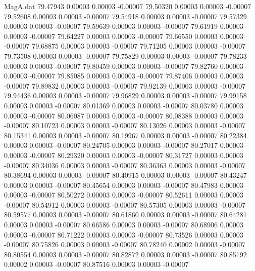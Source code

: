 \begin{filecontents}{MagA.dat}
  79.47943    0.00003    0.00003   -0.00007
  79.50320    0.00003    0.00003   -0.00007
  79.52608    0.00003    0.00003   -0.00007
  79.54918    0.00003    0.00003   -0.00007
  79.57329    0.00003    0.00003   -0.00007
  79.59639    0.00003    0.00003   -0.00007
  79.61919    0.00003    0.00003   -0.00007
  79.64227    0.00003    0.00003   -0.00007
  79.66550    0.00003    0.00003   -0.00007
  79.68875    0.00003    0.00003   -0.00007
  79.71205    0.00003    0.00003   -0.00007
  79.73508    0.00003    0.00003   -0.00007
  79.75829    0.00003    0.00003   -0.00007
  79.78233    0.00003    0.00003   -0.00007
  79.80459    0.00003    0.00003   -0.00007
  79.82760    0.00003    0.00003   -0.00007
  79.85085    0.00003    0.00003   -0.00007
  79.87406    0.00003    0.00003   -0.00007
  79.89832    0.00003    0.00003   -0.00007
  79.92139    0.00003    0.00003   -0.00007
  79.94436    0.00003    0.00003   -0.00007
  79.96829    0.00003    0.00003   -0.00007
  79.99158    0.00003    0.00003   -0.00007
  80.01369    0.00003    0.00003   -0.00007
  80.03780    0.00003    0.00003   -0.00007
  80.06087    0.00003    0.00003   -0.00007
  80.08388    0.00003    0.00003   -0.00007
  80.10723    0.00003    0.00003   -0.00007
  80.13026    0.00003    0.00003   -0.00007
  80.15341    0.00003    0.00003   -0.00007
  80.19967    0.00003    0.00003   -0.00007
  80.22384    0.00003    0.00003   -0.00007
  80.24705    0.00003    0.00003   -0.00007
  80.27017    0.00003    0.00003   -0.00007
  80.29320    0.00003    0.00003   -0.00007
  80.31727    0.00003    0.00003   -0.00007
  80.34036    0.00003    0.00003   -0.00007
  80.36363    0.00003    0.00003   -0.00007
  80.38694    0.00003    0.00003   -0.00007
  80.40915    0.00003    0.00003   -0.00007
  80.43247    0.00003    0.00003   -0.00007
  80.45654    0.00003    0.00003   -0.00007
  80.47983    0.00003    0.00003   -0.00007
  80.50272    0.00003    0.00003   -0.00007
  80.52611    0.00003    0.00003   -0.00007
  80.54912    0.00003    0.00003   -0.00007
  80.57305    0.00003    0.00003   -0.00007
  80.59577    0.00003    0.00003   -0.00007
  80.61860    0.00003    0.00003   -0.00007
  80.64281    0.00003    0.00003   -0.00007
  80.66586    0.00003    0.00003   -0.00007
  80.68906    0.00003    0.00003   -0.00007
  80.71222    0.00003    0.00003   -0.00007
  80.73526    0.00003    0.00003   -0.00007
  80.75826    0.00003    0.00003   -0.00007
  80.78240    0.00002    0.00003   -0.00007
  80.80554    0.00003    0.00003   -0.00007
  80.82872    0.00003    0.00003   -0.00007
  80.85192    0.00002    0.00003   -0.00007
  80.87516    0.00003    0.00003   -0.00007

\end{filecontents}
